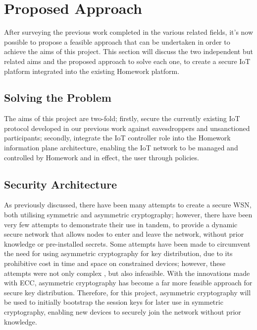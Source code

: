 \documentclass{mprop}
\begin{document}
\section{Proposed Approach}

After surveying the previous work completed in the various related fields, it's now possible to propose a feasible approach that can be undertaken in order to achieve the aims of this project. This section will discuss the two independent but related aims and the proposed approach to solve each one, to create a secure IoT platform integrated into the existing Homework platform.


\subsection{Solving the Problem} %
\label{sub:solving_the_problem}
The aims of this project are two-fold; firstly, secure the currently existing IoT protocol developed in our previous work against eavesdroppers and unsanctioned participants; secondly, integrate the IoT controller role into the Homework information plane architecture, enabling the IoT network to be managed and controlled by Homework and in effect, the user through policies.

\subsection{Security Architecture} %
\label{sub:security_architecture}
As previously discussed, there have been many attempts to create a secure WSN, both utilising symmetric and asymmetric cryptography; however, there have been very few attempts to demonstrate their use in tandem, to provide a dynamic secure network that allows nodes to enter and leave the network, without prior knowledge or pre-installed secrets. Some attempts have been made to circumvent the need for using asymmetric cryptography for key distribution, due to its prohibitive cost in time and space on constrained devices; however, these attempts were not only complex \cite{TinyPK}, but also infeasible\cite{MessageBottle}. With the innovations made with ECC, asymmetric cryptography has become a far more feasible approach for secure key distribution. Therefore, for this project, asymmetric cryptography will be used to initially bootstrap the session keys for later use in symmetric cryptography, enabling new devices to securely join the network without prior knowledge.
\end{document}
